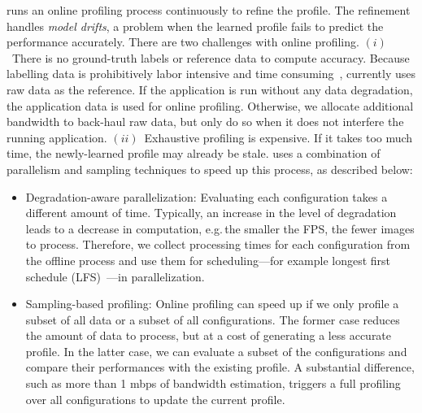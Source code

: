  \sysname{} runs an online profiling process
continuously to refine the profile. The refinement handles \textit{model
  drifts}, a problem when the learned profile fails to predict the performance
accurately. There are two challenges with online profiling.
$(i)$~There is no ground-truth labels or reference data to compute
accuracy. Because labelling data is prohibitively labor intensive and time
consuming~\cite{russell2008labelme}, \sysname{} currently uses raw data as the
reference. If the application is run without any data degradation, the
application data is used for online profiling. Otherwise, we allocate additional
bandwidth to back-haul raw data, but only do so when it does not interfere the
running application.
$(ii)$~Exhaustive profiling is expensive. If it takes too much time,
the newly-learned profile may already be stale. \sysname{} uses a combination of
parallelism and sampling techniques to speed up this process, as described below:

\begin{itemize}[leftmargin=*]

\item Degradation-aware parallelization: Evaluating each configuration takes a
different amount of time. Typically, an increase in the level of degradation
leads to a decrease in computation, e.g.\,the smaller the FPS, the fewer images
to process. Therefore, we collect processing times for each configuration from
the offline process and use them for scheduling---for example longest first
schedule (LFS)~\cite{karger2010scheduling}---in parallelization.

\item Sampling-based profiling: Online profiling can speed up if we only profile a subset of all data or a subset of all configurations. 
The former case reduces the amount of data to process, but at a cost of generating a less accurate profile. In the latter case, we can evaluate a subset of the configurations and compare their performances with the existing profile. A substantial difference, such as more than 1 mbps of bandwidth estimation, triggers a full profiling over all configurations to update the current profile.

\end{itemize}

